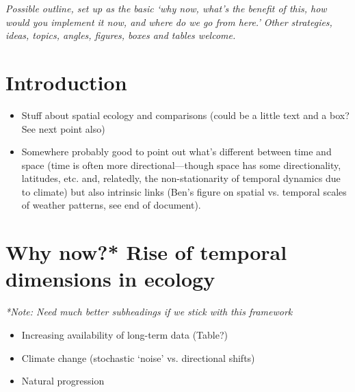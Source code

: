 \documentclass[11pt,a4paper]{article}
\newenvironment{smitemize}{
\begin{itemize}
  \setlength{\itemsep}{1pt}
  \setlength{\parskip}{0pt}
  \setlength{\parsep}{0pt}}
{\end{itemize}
}
\newcommand*\dashme{\item[--]}
\begin{document}
\newpage
\noindent \emph{Possible outline, set up as the basic `why now, what's the benefit of this, how would you implement it now, and where do we go from here.' Other strategies, ideas, topics, angles, figures, boxes and tables welcome.}

\section{Introduction}
\begin{smitemize}
\dashme Stuff about spatial ecology and comparisons (could be a little text and a box? See next point also)
\dashme Somewhere probably good to point out what's different between time and space (time is often more directional---though space has some directionality, latitudes, etc. and, relatedly, the non-stationarity of temporal dynamics due to climate) but also intrinsic links (Ben's figure on spatial vs. temporal scales of weather patterns, see end of document).
\end{smitemize}
\section{Why now?* Rise of temporal dimensions in ecology}
\emph{*Note: Need much better subheadings if we stick with this framework}
\begin{smitemize}
\dashme Increasing availability of long-term data (Table?)
\dashme Climate change (stochastic `noise' vs. directional shifts)
\dashme Natural progression 
\end{smitemize}
\end{document}
